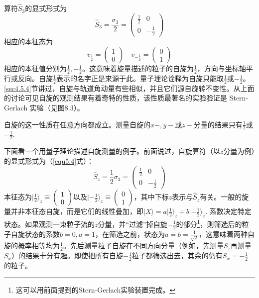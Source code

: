 算符$\hat{S}_3$的显式形式为
\begin{equation}
	\hat{S}_3 = \frac{\sigma_3}{2} = 
		\begin{pmatrix}
			\frac{1}{2} & 0 \\
			0 & -\frac{1}{2}
		\end{pmatrix}
\label{equ8.46}
\end{equation}
相应的本征态为
\begin{equation}
	v_{\frac{1}{2}} = 
		\begin{pmatrix}
			1 \\ 0
		\end{pmatrix}
	\quad
	v_{-\frac{1}{2}} =
		\begin{pmatrix}
			0 \\ 1
		\end{pmatrix}
\label{equ8.47}
\end{equation}
相应的本征值分别为$\frac{1}{2}, -\frac{1}{2}$。这意味着旋量描述的粒子的自旋为$\frac{1}{2}$，方向与坐标轴平行或反向。自旋$\frac{1}{2}$表示的名字正是来源于此。量子理论诠释为自旋只能取$\frac{1}{2}$或$-\frac{1}{2}$。\ref{sec4.5.4}节讲过，自旋与轨道角动量有些相似，并且它们源自旋转不变性。从上面的讨论可见自旋的观测结果有着奇特的性质，该性质最著名的实验验证是 Stern-Gerlach 实验（见图8.3）。

自旋的这一性质在任意方向都成立。测量自旋的$x-, y-$或$z-$分量的结果只有$\frac{1}{2}$或$-\frac{1}{2}$.

下面看一个用量子理论描述自旋测量的例子。前面说过，自旋算符（以$z$分量为例）的显式形式为（\eqref{equ5.4}式）：
\begin{equation}
\label{equ8.48}
	\hat{S}_z = \frac{1}{2} \sigma_3 = 
		\begin{pmatrix}
			\frac{1}{2} & 0 \\
			0 & -\frac{1}{2}
		\end{pmatrix}
\end{equation}
本征态为$|\frac{1}{2}\rangle_z \hat{=} \begin{pmatrix} 1 \\ 0 \end{pmatrix}$以及$|-\frac{1}{2}\rangle_z \hat{=} \begin{pmatrix} 0 \\ 1 \end{pmatrix}$，其中下标$z$表示与$\hat{S}_z$有关。一般的旋量并非本征态自旋，而是它们的线性叠加，即$|X\rangle = a |\frac{1}{2}\rangle_z + b |-\frac{1}{2}\rangle_z$. 系数决定特定状态。如果观测一束粒子流的$z$分量，并“过滤”掉自旋$-\frac{1}{2}$的部分\footnote{这可以用前面提到的Stern-Gerlach实验装置完成。}，则筛选后的粒子自旋状态的系数$b = 0, a = 1$，在筛选之前，状态为$a = b = \frac{1}{\sqrt{2}}$，这意味着两种自旋的概率相等均为$\frac{1}{2}$。先后测量粒子自旋在不同方向分量（例如，先测量$S_z$再测量$S_x$）的结果十分有趣。即使把所有自旋$-\frac{1}{2}$粒子都筛选出去，其余的仍有$S_x = -\frac{1}{2}$的粒子。

